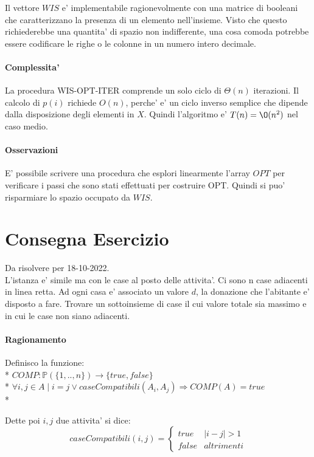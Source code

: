 Il vettore $WIS$ e' implementabile ragionevolmente con una matrice di booleani che caratterizzano la presenza di un elemento nell'insieme. Visto che questo richiederebbe una quantita' di spazio non indifferente, una cosa comoda potrebbe essere codificare le righe o le colonne in un numero intero decimale.

\paragraph{Complessita'}

La procedura WIS-OPT-ITER comprende un solo ciclo di $\Theta(n)$ iterazioni.
Il calcolo di $p(i)$ richiede $O(n)$, perche' e' un ciclo inverso semplice che dipende dalla disposizione degli elementi in $X$.
Quindi l'algoritmo e' $T(n) = \O(n^2)$ nel caso medio.

\paragraph{Osservazioni}

E' possibile scrivere una procedura che esplori linearmente l'array $OPT$ per verificare i passi che sono stati effettuati per costruire OPT. Quindi si puo' risparmiare lo spazio occupato da $WIS$.

\newpage

\section{Consegna Esercizio}
Da risolvere per 18-10-2022. \\

L'istanza e' simile ma con le case al posto delle attivita'.
Ci sono n case adiacenti in linea retta.
Ad ogni casa e' associato un valore $d$, la donazione che l'abitante e' disposto a fare.
Trovare un sottoinsieme di case il cui valore totale sia massimo e in cui le case non siano adiacenti.

\paragraph{Ragionamento}

Definisco la funzione: \\*
$COMP : \mathbb{P}(\{1,..,n\}) \rightarrow \{true, false\}$ \\*
$\forall i,j \in A \mid i = j \lor caseCompatibili(A_i,A_j) \Rightarrow COMP(A) = true$ \\*

Dette poi $i,j$ due attivita' si dice:
\[
    caseCompatibili(i,j) =
    \begin{cases}
        \text{$true$} & \text{$|i - j| > 1$} \\
        \text{$false$} & altrimenti
    \end{cases}
\]

